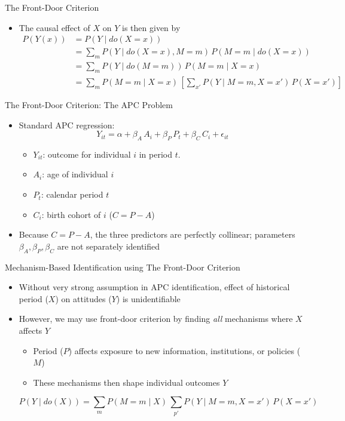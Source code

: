 \documentclass[aspectratio=1610,12pt,xcolor=dvipsnames]{beamer}
\begin{document}
\begin{frame}{The Front-Door Criterion}
    \begin{itemize}
    \item The causal effect of $X$ on $Y$ is then given by
    \begin{align*}
    P(Y(x)) 
    &= P(Y \mid do(X=x)) \\
    &= \sum_m P(Y \mid do(X=x), M=m)\, P(M=m \mid do(X=x)) \\
    &= \sum_m P(Y \mid do(M=m))\, P(M=m \mid X=x) \\
    &= \sum_m P(M=m \mid X=x)\,
       \left[ \sum_{x'} P(Y \mid M=m, X=x')\, P(X=x') \right]
    \end{align*}
    \end{itemize}
\end{frame}

\begin{frame}{The Front-Door Criterion: The APC Problem}

\begin{itemize}
    \item Standard APC regression:
\[
Y_{it} = \alpha + \beta_A \, A_i + \beta_P \, P_t + \beta_C \, C_i + \epsilon_{it}
\]

\begin{itemize}
    \item $Y_{it}$: outcome for individual $i$ in period $t$.
    \item $A_i$: age of individual $i$
    \item $P_t$: calendar period $t$
    \item $C_i$: birth cohort of $i$ ($C = P - A$)
\end{itemize}

\item Because $C = P - A$, the three predictors are perfectly collinear; parameters $\beta_A, \beta_P, \beta_C$ are not separately identified
\end{itemize}
\end{frame}

\begin{frame}{Mechanism-Based Identification using The Front-Door Criterion}

\begin{itemize}
    \item Without very strong assumption in APC identification, effect of historical period ($X$) on attitudes ($Y$) is unidentifiable
    \item However, we may use front-door criterion by finding \textit{all} mechanisms where $X$ affects $Y$
    \begin{itemize}
    \item Period ($P$) affects exposure to new information, institutions, or policies ($M$)
    \item These mechanisms then shape individual outcomes $Y$
\end{itemize}
\[
P(Y \mid do(X)) 
= \sum_m P(M=m \mid X)\,
  \sum_{p'} P(Y \mid M=m, X=x')\,P(X=x')
\]
\end{itemize}
\end{frame}
\end{document}
